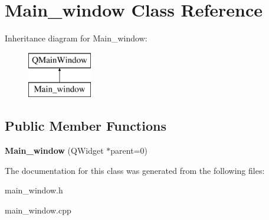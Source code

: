 \hypertarget{class_main__window}{\section{Main\-\_\-window Class Reference}
\label{class_main__window}
}
Inheritance diagram for Main\-\_\-window\-:\begin{figure}[H]
\begin{center}
\leavevmode
\includegraphics[height=2.000000cm]{class_main__window}
\end{center}
\end{figure}
\subsection*{Public Member Functions}
\begin{DoxyCompactItemize}
\item 
\hypertarget{class_main__window_a6fc238fd46eac0aef63bbaec7eddda02}{{\bfseries Main\-\_\-window} (Q\-Widget $\ast$parent=0)}\label{class_main__window_a6fc238fd46eac0aef63bbaec7eddda02}

\end{DoxyCompactItemize}


The documentation for this class was generated from the following files\-:\begin{DoxyCompactItemize}
\item 
main\-\_\-window.\-h\item 
main\-\_\-window.\-cpp\end{DoxyCompactItemize}
